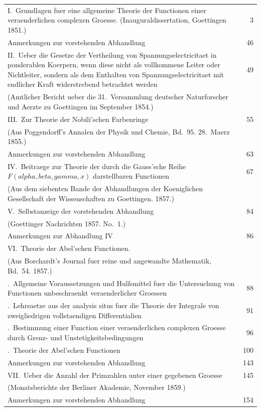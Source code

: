 \documentclass[12pt,a4paper]{book}
\theoremstyle{definition}
\theoremstyle{remark}
\begin{document}
\begin{longtable}{p{12cm}r}
I.\ Grundlagen fuer eine allgemeine Theorie der Functionen einer veraenderlichen complexen Groesse. (Inauguraldissertation, Goettingen 1851.) & 3\\
\quad Anmerkungen zur vorstehenden Abhandlung & 46\\[0.5em]

II.\ Ueber die Gesetze der Vertheilung von Spannungselectricitaet in ponderablen Koerpern, wenn diese nicht als vollkommene Leiter oder Nichtleiter, sondern als dem Enthalten von Spannungselectricitaet mit endlicher Kraft widerstrebend betrachtet werden & 49\\
\quad (Amtlicher Bericht ueber die 31.\ Versammlung deutscher Naturforscher und Aerzte zu Goettingen im September 1854.)\\[0.5em]

III.\ Zur Theorie der Nobili'schen Farbenringe & 55\\
\quad (Aus Poggendorff's Annalen der Physik und Chemie, Bd.\ 95. 28.\ Maerz 1855.)\\
\quad Anmerkungen zur vorstehenden Abhandlung & 63\\[0.5em]

IV.\ Beitraege zur Theorie der durch die Gauss'sche Reihe $F(alpha, beta, gamma, x)$ darstellbaren Functionen & 67\\
\quad (Aus dem siebenten Bande der Abhandlungen der Koeniglichen Gesellschaft der Wissenschaften zu Goettingen. 1857.)\\[0.5em]

V.\ Selbstanzeige der vorstehenden Abhandlung & 84\\
\quad (Goettinger Nachrichten 1857. No.\ 1.)\\
\quad Anmerkungen zur Abhandlung IV & 86\\[0.5em]

VI.\ Theorie der Abel'schen Functionen. & \\
\quad (Aus Borchardt's Journal fuer reine und angewandte Mathematik, Bd.\ 54. 1857.)\\
\quad 1.\ Allgemeine Voraussetzungen und Hulfsmittel fuer die Untersuchung von Functionen unbeschraenkt veraenderlicher Groessen & 88\\
\quad 2.\ Lehrsaetze aus der analysis situs fuer die Theorie der Integrale von zweigliedrigen vollstaendigen Differentialien & 91\\
\quad 3.\ Bestimmung einer Function einer veraenderlichen complexen Groesse durch Grenz- und Unstetigkeitsbedingungen & 96\\
\quad 4.\ Theorie der Abel'schen Functionen & 100\\
\quad Anmerkungen zur vorstehenden Abhandlung & 143\\[0.5em]

VII.\ Ueber die Anzahl der Primzahlen unter einer gegebenen Groesse & 145\\
\quad (Monatsberichte der Berliner Akademie, November 1859.)\\
\quad Anmerkungen zur vorstehenden Abhandlung & 154\\
\end{longtable}
\end{document}
